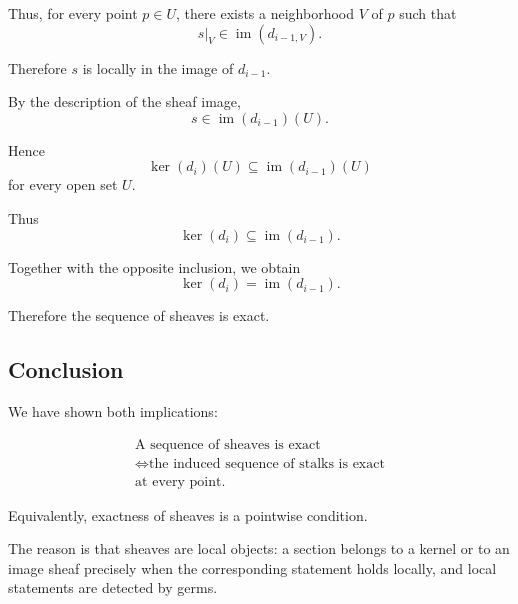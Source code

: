 Thus, for every point $p \in U$, there exists a neighborhood $V$ of $p$ such
that
\[
s|_V \in \operatorname{im}(d_{i-1,V}).
\]

Therefore $s$ is locally in the image of $d_{i-1}$.

By the description of the sheaf image,
\[
s \in \operatorname{im}(d_{i-1})(U).
\]

Hence
\[
\ker(d_i)(U)
\subseteq
\operatorname{im}(d_{i-1})(U)
\]
for every open set $U$.

Thus
\[
\ker(d_i)
\subseteq
\operatorname{im}(d_{i-1}).
\]

Together with the opposite inclusion, we obtain
\[
\ker(d_i)
=
\operatorname{im}(d_{i-1}).
\]

Therefore the sequence of sheaves is exact.

\subsection*{Conclusion}

We have shown both implications:

\[
\boxed{\begin{gathered}
\text{A sequence of sheaves is exact}\\
\iff\text{the induced sequence of stalks is exact}\\
\text{at every point.}
\end{gathered}}
\]

Equivalently, exactness of sheaves is a pointwise condition.

The reason is that sheaves are local objects: a section belongs to a kernel or
to an image sheaf precisely when the corresponding statement holds locally,
and local statements are detected by germs.
